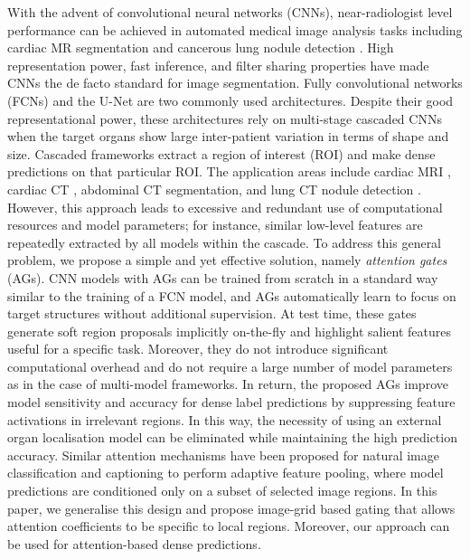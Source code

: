 \documentclass{article}
\begin{document}
With the advent of convolutional neural networks (CNNs), near-radiologist level performance can be achieved in automated medical image analysis tasks including cardiac MR segmentation \cite{bai2017human} and cancerous lung nodule detection \cite{liao2017evaluate}. High representation power, fast inference, and filter sharing properties have made CNNs the de facto standard for image segmentation. Fully convolutional networks (FCNs) \cite{long2015fully} and the U-Net \cite{ronneberger2015u} are two commonly used architectures. Despite their good representational power, these architectures rely on multi-stage cascaded CNNs when the target organs show large inter-patient variation in terms of shape and size. Cascaded frameworks extract a region of interest (ROI) and make dense predictions on that particular ROI. The application areas include cardiac MRI \cite{khened2018fully}, cardiac CT \cite{payer2017multi}, abdominal CT \cite{roth2018media, roth2017hierarchical} segmentation, and lung CT nodule detection \cite{liao2017evaluate}. However, this approach leads to excessive and redundant use of computational resources and model parameters; for instance, similar low-level features are repeatedly extracted by all models within the cascade. To address this general problem, we propose a simple and yet effective solution, namely \emph{attention gates} (AGs). CNN models with AGs can be trained from scratch in a standard way similar to the training of a FCN model, and AGs automatically learn to focus on target structures without additional supervision. At test time, these gates generate soft region proposals implicitly on-the-fly and highlight salient features useful for a specific task. Moreover, they do not introduce significant computational overhead and do not require a large number of model parameters as in the case of multi-model frameworks. In return, the proposed AGs improve model sensitivity and accuracy for dense label predictions by suppressing feature activations in irrelevant regions. In this way, the necessity of using an external organ localisation model can be eliminated while maintaining the high prediction accuracy. Similar attention mechanisms have been proposed for natural image classification \cite{jetley2018learn} and captioning \cite{anderson2017bottom} to perform adaptive feature pooling, where model predictions are conditioned only on a subset of selected image regions. In this paper, we generalise this design and propose image-grid based gating that allows attention coefficients to be specific to local regions. Moreover, our approach can be used for attention-based dense predictions. 
\end{document}
